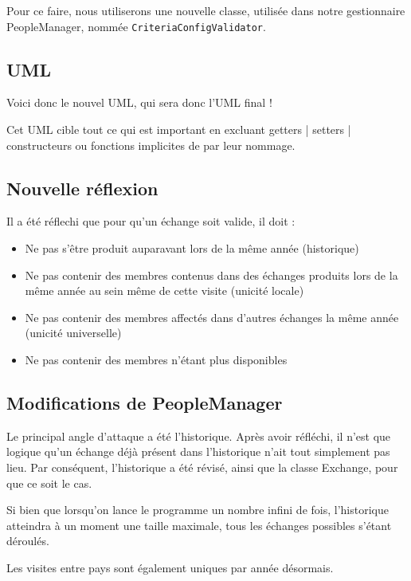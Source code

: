 \documentclass{mytex}
\begin{document}
Pour ce faire, nous utiliserons une nouvelle classe, utilisée dans notre gestionnaire PeopleManager, nommée \texttt{CriteriaConfigValidator}.

\subsection{UML}

Voici donc le nouvel UML, qui sera donc l'UML final !

Cet UML cible tout ce qui est important en excluant getters | setters | constructeurs ou fonctions implicites de par leur nommage.


\subsection{Nouvelle réflexion}

Il a été réflechi que pour qu'un échange soit valide, il doit :

\begin{itemize}
	\item Ne pas s'être produit auparavant lors de la même année (historique)
	\item Ne pas contenir des membres contenus dans des échanges produits lors de la même année au sein même de cette visite (unicité locale)
	\item Ne pas contenir des membres affectés dans d'autres échanges la même année (unicité universelle)
	\item Ne pas contenir des membres n'étant plus disponibles
\end{itemize}

\subsection{Modifications de PeopleManager}

Le principal angle d'attaque a été l'historique.
Après avoir réfléchi, il n'est que logique qu'un échange déjà présent dans l'historique n'ait tout simplement pas lieu.
Par conséquent, l'historique a été révisé, ainsi que la classe Exchange, pour que ce soit le cas.

Si bien que lorsqu'on lance le programme un nombre infini de fois, l'historique atteindra à un moment une taille maximale, tous les échanges possibles s'étant déroulés.

Les visites entre pays sont également uniques par année désormais.
\end{document}
